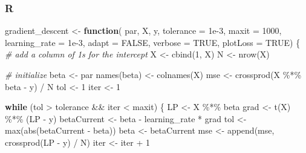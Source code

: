 \documentclass[
  letterpaper,
]{krantz}
\newenvironment{Shaded}{}{}
\newcommand{\AttributeTok}[1]{\textcolor[rgb]{0.49,0.56,0.16}{#1}}
\newcommand{\CommentTok}[1]{\textcolor[rgb]{0.38,0.63,0.69}{\textit{#1}}}
\newcommand{\ConstantTok}[1]{\textcolor[rgb]{0.53,0.00,0.00}{#1}}
\newcommand{\ControlFlowTok}[1]{\textcolor[rgb]{0.00,0.44,0.13}{\textbf{#1}}}
\newcommand{\DecValTok}[1]{\textcolor[rgb]{0.25,0.63,0.44}{#1}}
\newcommand{\FloatTok}[1]{\textcolor[rgb]{0.25,0.63,0.44}{#1}}
\newcommand{\FunctionTok}[1]{\textcolor[rgb]{0.02,0.16,0.49}{#1}}
\newcommand{\NormalTok}[1]{#1}
\newcommand{\OtherTok}[1]{\textcolor[rgb]{0.00,0.44,0.13}{#1}}
\newcommand{\SpecialCharTok}[1]{\textcolor[rgb]{0.25,0.44,0.63}{#1}}
\begin{document}
\subsubsection{R}

\begin{Shaded}
\begin{Highlighting}[]
\NormalTok{gradient\_descent }\OtherTok{\textless{}{-}} \ControlFlowTok{function}\NormalTok{(}
\NormalTok{    par,}
\NormalTok{    X,}
\NormalTok{    y,}
    \AttributeTok{tolerance =} \FloatTok{1e{-}3}\NormalTok{,}
    \AttributeTok{maxit =} \DecValTok{1000}\NormalTok{,}
    \AttributeTok{learning\_rate =} \FloatTok{1e{-}3}\NormalTok{,}
    \AttributeTok{adapt =} \ConstantTok{FALSE}\NormalTok{,}
    \AttributeTok{verbose =} \ConstantTok{TRUE}\NormalTok{,}
    \AttributeTok{plotLoss =} \ConstantTok{TRUE}\NormalTok{) \{}
    \CommentTok{\# add a column of 1s for the intercept}
\NormalTok{    X }\OtherTok{\textless{}{-}} \FunctionTok{cbind}\NormalTok{(}\DecValTok{1}\NormalTok{, X)}
\NormalTok{    N }\OtherTok{\textless{}{-}} \FunctionTok{nrow}\NormalTok{(X)}

    \CommentTok{\# initialize}
\NormalTok{    beta }\OtherTok{\textless{}{-}}\NormalTok{ par}
    \FunctionTok{names}\NormalTok{(beta) }\OtherTok{\textless{}{-}} \FunctionTok{colnames}\NormalTok{(X)}
\NormalTok{    mse }\OtherTok{\textless{}{-}} \FunctionTok{crossprod}\NormalTok{(X }\SpecialCharTok{\%*\%}\NormalTok{ beta }\SpecialCharTok{{-}}\NormalTok{ y) }\SpecialCharTok{/}\NormalTok{ N}
\NormalTok{    tol }\OtherTok{\textless{}{-}} \DecValTok{1}
\NormalTok{    iter }\OtherTok{\textless{}{-}} \DecValTok{1}

    \ControlFlowTok{while}\NormalTok{ (tol }\SpecialCharTok{\textgreater{}}\NormalTok{ tolerance }\SpecialCharTok{\&\&}\NormalTok{ iter }\SpecialCharTok{\textless{}}\NormalTok{ maxit) \{}
\NormalTok{        LP }\OtherTok{\textless{}{-}}\NormalTok{ X }\SpecialCharTok{\%*\%}\NormalTok{ beta}
\NormalTok{        grad }\OtherTok{\textless{}{-}} \FunctionTok{t}\NormalTok{(X) }\SpecialCharTok{\%*\%}\NormalTok{ (LP }\SpecialCharTok{{-}}\NormalTok{ y)}
\NormalTok{        betaCurrent }\OtherTok{\textless{}{-}}\NormalTok{ beta }\SpecialCharTok{{-}}\NormalTok{ learning\_rate }\SpecialCharTok{*}\NormalTok{ grad}
\NormalTok{        tol }\OtherTok{\textless{}{-}} \FunctionTok{max}\NormalTok{(}\FunctionTok{abs}\NormalTok{(betaCurrent }\SpecialCharTok{{-}}\NormalTok{ beta))}
\NormalTok{        beta }\OtherTok{\textless{}{-}}\NormalTok{ betaCurrent}
\NormalTok{        mse }\OtherTok{\textless{}{-}} \FunctionTok{append}\NormalTok{(mse, }\FunctionTok{crossprod}\NormalTok{(LP }\SpecialCharTok{{-}}\NormalTok{ y) }\SpecialCharTok{/}\NormalTok{ N)}
\NormalTok{        iter }\OtherTok{\textless{}{-}}\NormalTok{ iter }\SpecialCharTok{+} \DecValTok{1}


\end{Highlighting}
\end{Shaded}
\end{document}
